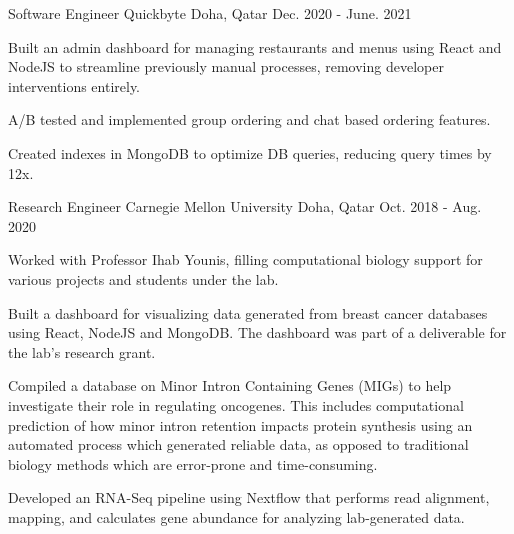 \begin{cventries}
  \cventry
    {Software Engineer} %
    {Quickbyte} %
    {Doha, Qatar} %
    {Dec. 2020 - June. 2021} %
    {
      \begin{cvitems} %
        \item {Built an admin dashboard for managing restaurants and menus using React and NodeJS to streamline previously manual processes, removing developer interventions entirely.}
        \item {A/B tested and implemented group ordering and chat based ordering features.}
        \item {Created indexes in MongoDB to optimize DB queries, reducing query times by 12x.}
      \end{cvitems}
    }

  \cventry
    {Research Engineer} %
    {Carnegie Mellon University} %
    {Doha, Qatar} %
    {Oct. 2018 - Aug. 2020} %
    {
      \begin{cvitems} %
        \item {Worked with Professor Ihab Younis, filling computational biology support for various projects and students under the lab.}
        \item {Built a dashboard for visualizing data generated from breast cancer databases using React, NodeJS and MongoDB. The
        dashboard was part of a deliverable for the lab’s research grant.}
        \item {Compiled a database on Minor Intron Containing Genes (MIGs) to help investigate their role in regulating oncogenes. This
        includes computational prediction of how minor intron retention impacts protein synthesis using an automated process
        which generated reliable data, as opposed to traditional biology methods which are error-prone and time-consuming.}
        \item {Developed an RNA-Seq pipeline using Nextflow that performs read alignment, mapping, and calculates gene abundance for
        analyzing lab-generated data.}
      \end{cvitems}
    }

\end{cventries}
